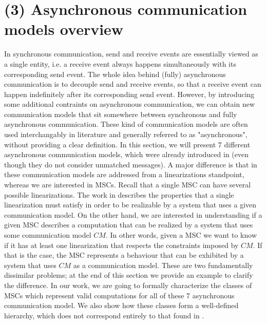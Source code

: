 \section{(3) Asynchronous communication models overview}
\label{sec:com_models_overview}

In synchronous communication, send and receive events are essentially viewed as a single entity, i.e. a receive event always happens simultaneously with its corresponding send event. The whole idea behind (fully) asynchronous communication is to decouple send and receive events, so that a receive event can happen indefinitely after its corresponding send event. However, by introducing some additional contraints on asynchronous communication, we can obtain new communication models that sit somewhere between synchronous and fully asynchronous communication. These kind of communication models are often used interchangably in literature and generally referred to as "asynchronous", without providing a clear definition. In this section, we will present 7 different asynchronous communication models, which were already introduced in \cite{DBLP:journals/fac/ChevrouHQ16} (even though they do not consider unmatched messages). A major difference is that in \cite{DBLP:journals/fac/ChevrouHQ16} these communication models are addressed from a linearizations standpoint, whereas we are interested in MSCs. Recall that a single MSC can have several possible linearizations. The work in \cite{DBLP:journals/fac/ChevrouHQ16} describes the properties that a single linearization must satisfy in order to be realizable by a system that uses a given communication model. On the other hand, we are interested in understanding if a given MSC describes a computation that can be realized by a system that uses some communication model $CM$. In other words, given a MSC we want to know if it has at least one linearization that respects the constraints imposed by $CM$. If that is the case, the MSC represents a behaviour that can be exhibited by a system that uses $CM$ as a communication model. These are two fundamentally dissimilar problems; at the end of this section we provide an example to clarify the difference. In our work, we are going to formally characterize the classes of MSCs which represent valid computations for all of these 7 asynchronous communication model. We also show how these classes form a well-defined hierarchy, which does not correspond entirely to that found in \cite{DBLP:journals/fac/ChevrouHQ16}.


